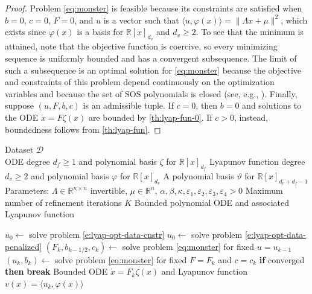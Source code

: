 \documentclass[11pt]{amsart}
\numberwithin{equation}{section}
\theoremstyle{plain}
\theoremstyle{definition}
\theoremstyle{remark}
\newcommand{\R}{\mathbb{R}}
\renewcommand{\vec}[1]{{#1}}
\newcommand{\mat}[1]{{#1}}
\newcommand{\ip}[2]{\langle #1, #2 \rangle}
\newcommand{\methodname}{{SILAS}}
\begin{document}
\begin{proof}
    Problem \cref{eq:monster} is feasible because its constraints are satisfied when $b=0$, $c=0$, $\mat{F}=0$, and $\vec{u}$ is a vector such that $\ip{\vec{u}}{\varphi(\vec{x})}  =  \|\mat{\Lambda} \vec{x} + \vec{\mu}\|^2$, which exists since $\varphi(\vec{x})$ is a basis for $\R[x]_{d_v}$ and $d_v\geq 2$. 
    To see that the minimum is attained, note that the objective function is coercive, so every minimizing sequence is uniformly bounded and has a convergent subsequence. The limit of such a subsequence is an optimal solution for \cref{eq:monster} because the objective and constraints of this problem depend continuously on the optimization variables and because the set of SOS polynomials is closed (see, e.g., \cite[Corollary~3.5]{Laurent2009}).
    Finally, suppose $(\vec{u},\mat{F},b,c)$ is an admissible tuple. If $c=0$, then $b=0$ and solutions to the ODE $\dot{x}=\mat{F} \zeta(x)$ are bounded by \cref{th:lyap-fun-0}. If $c>0$, instead, boundedness follows from \cref{th:lyap-fun}.
\end{proof}
%
\begin{algorithm}[t]
\caption{The \methodname\ framework for bounded ODE discovery}
\label{alg:learn-ode}
\begin{algorithmic}
\REQUIRE Dataset $\mathcal{D}$\\
\REQUIRE ODE degree $d_f\geq 1$ and polynomial basis $\zeta$ for $\R[x]_{d_f}$
\REQUIRE Lyapunov function degree $d_v \geq 2$ and polynomial basis $\varphi$ for $\R[x]_{d_v}$
\REQUIRE A polynomial basis $\vartheta$ for $\R[x]_{d_v+d_f-1}$
\REQUIRE Parameters: $\Lambda \in \R^{n \times n}$ invertible, $\vec{\mu} \in \R^n$, $\alpha,\beta,\kappa,\varepsilon_1,\varepsilon_2,\varepsilon_3,\varepsilon_4 > 0$
\REQUIRE Maximum number of refinement iterations $K$
\ENSURE Bounded polynomial ODE and associated Lyapunov function

\STATE $\vec{u}_0 \gets$ solve problem \cref{e:lyap-opt-data-cnstr} 
  \STATE $\vec{u}_0 \gets$ solve problem \cref{e:lyap-opt-data-penalized}
\ENDIF
  \STATE $(\mat{F}_k, b_{k-1/2}, c_k) \gets$ solve problem \cref{eq:monster} for fixed $\vec{u}=\vec{u}_{k-1}$
  \STATE $(\vec{u}_k, b_k) \gets$ solve problem \cref{eq:monster} for fixed $\mat{F}=\mat{F}_{k}$ and $c=c_k$
  \STATE \textbf{if} converged \textbf{then} \textbf{break}
\ENDFOR
\RETURN Bounded ODE $\dot{\vec{x}} = \mat{F}_k \zeta(\vec{x})$ and Lyapunov function $v(\vec{x}) = \ip{\vec{u}_k}{\varphi(\vec{x})}$
\end{algorithmic}
\end{algorithm}
\end{document}
